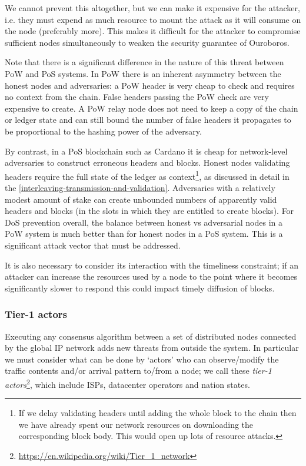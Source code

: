 \documentclass[11pt,a4paper]{article}
\begin{document}
We cannot prevent this altogether, but we can make it expensive for the
attacker, i.e. they must expend as much resource to mount the attack as
it will consume on the node (preferably more). This makes it difficult
for the attacker to compromise sufficient nodes simultaneously to weaken
the security guarantee of Ouroboros.

Note that there is a significant difference in the nature of this threat
between PoW and PoS systems. In PoW there is an inherent asymmetry
between the honest nodes and adversaries: a PoW header is very cheap to
check and requires no context from the chain. False headers passing the
PoW check are very expensive to create. A PoW relay node does not need
to keep a copy of the chain or ledger state and can still bound the
number of false headers it propagates to be proportional to the hashing
power of the adversary.

By contrast, in a PoS blockchain such as Cardano it is cheap for
network-level adversaries to construct erroneous headers and blocks.
Honest nodes validating headers require the full state of the ledger as
context\footnote{If we delay validating headers until adding the whole
  block to the chain then we have already spent our network resources on
  downloading the corresponding block body. This would open up lots of
  resource attacks.}, as discussed in detail in the
\cref{interleaving-transmission-and-validation}. Adversaries with a relatively modest amount of stake can create
unbounded numbers of apparently valid headers and blocks (in the slots
in which they are entitled to create blocks). For DoS prevention
overall, the balance between honest vs adversarial nodes in a PoW system
is much better than for honest nodes in a PoS system. This is a
significant attack vector that must be addressed.

It is also necessary to consider its interaction with the timeliness
constraint; if an attacker can increase the resources used by a node to
the point where it becomes significantly slower to respond this could
impact timely diffusion of blocks.

\subsubsection{Tier-1 actors}
\label{tier-1-actors}

Executing any consensus algorithm between a set of distributed nodes
connected by the global IP network adds new threats from outside the
system. In particular we must consider what can be done by `actors' who
can observe/modify the traffic contents and/or arrival pattern to/from a
node; we call these \emph{tier-1 actors}\footnote{\href{https://en.wikipedia.org/wiki/Tier_1_network}{{https://en.wikipedia.org/wiki/Tier\_1\_network}}},
which include ISPs, datacenter operators and nation states.
\end{document}
